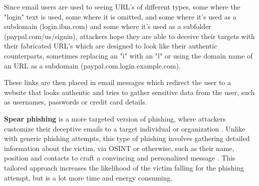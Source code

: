 Since email users are used to seeing URL's of different types, some where the "login" text is used, some where it is omitted, and some where it's used as a subdomain (login.ibm.com) and some where it's used as a subfolder (paypal.com/us/signin), attackers hope they are able to deceive their targets with their fabricated URL's which are designed to look like their authentic counterparts, sometimes replacing an "i" with an "l" or using the domain name of an URL as a subdomain (paypal.com.login.example.com).

These links are then placed in email messages which redirect the user to a website that looks authentic and tries to gather sensitive data from the user, such as usernames, passwords or credit card details.

\begin{comment}

Table \ref{tab:placeholder_label} presents a sample, legitimate URL and a non-functional URL used for phishing purposes. The target user is hoped by the attacker to be unaware of the different domains these seemingly similar URL's redirect the user. The phishing URL is taken from a dataset of known phishing websites but its domain is changed to IANA's example.com domain for security. The legitimate URL is from PayPal's website and is functional as of writing.

\begin{table}[h]
    \centering
    \begin{tabular}{|l|l|}
        \hline
        \textbf{Legitimate} & \textbf{Phishing} \\ \hline
        paypal.com/us/signin &paypal.com.cgi-bin.788a5.example.com \\ \hline
        login.ibm.com & login.lbm.example.com \\ \hline
        
    \end{tabular}
    \caption{Examples of legitimate URL's and non-working phishing URL's.}
    \label{tab:placeholder_label}
\end{table}

\end{comment}

\textbf{Spear phishing} is a more targeted version of phishing, where attackers customize their deceptive emails to a target individual or organization \citep{basitComprehensiveSurveyAIenabledPhishingAttacks2021}. Unlike with generic phishing attempts, this type of phishing involves gathering detailed information about the victim, via OSINT or otherwise, such as their name, position and contacts to craft a convincing and personalized message \citep{salahdineSocialEngineeringAttacks2019}. This tailored approach increases the likelihood of the victim falling for the phishing attempt, but is a lot more time and energy consuming.

